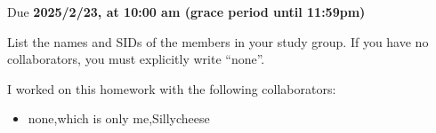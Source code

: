 \documentclass[11pt]{article}
\def\duedate{2025/2/23, at 10:00 am (grace period until 11:59pm)}
\begin{document}
\maketitle
Due \textbf{\duedate}


List the names and SIDs of the members in your study group.
If you have no collaborators, you must explicitly write ``none''.

\begin{solution} I worked on this homework with the following collaborators:
\begin{itemize}
    \item none,which is only me,Sillycheese
\end{itemize}
\end{solution}

\end{document}

